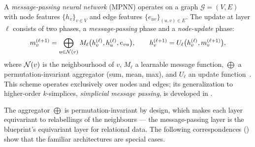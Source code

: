 \begin{definition}
\label{def:priors:mpnn}
A \emph{message-passing neural network} (MPNN) operates on a graph
$\mathcal{G} = (V, E)$ with node features $\{h_v\}_{v \in V}$ and edge features
$\{e_{uv}\}_{(u,v) \in E}$. The update at layer $\ell$ consists of two phases,
a \emph{message-passing} phase and a \emph{node-update} phase:
\[
  m_v^{(\ell+1)} = \bigoplus_{u \in \mathcal{N}(v)}
      M_\ell\bigl(h_v^{(\ell)}, h_u^{(\ell)}, e_{vu}\bigr),
  \qquad
  h_v^{(\ell+1)} = U_\ell\bigl(h_v^{(\ell)}, m_v^{(\ell+1)}\bigr),
\]
where $\mathcal{N}(v)$ is the neighbourhood of $v$, $M_\ell$ a learnable message
function, $\bigoplus$ a permutation-invariant aggregator (sum, mean, max), and
$U_\ell$ an update function~\citep{gilmer2017neural}. This scheme operates
exclusively over nodes and edges; its generalization to higher-order
$k$-simplices, \emph{simplicial message passing}, is developed in
.
\end{definition}

The aggregator $\bigoplus$ is permutation-invariant by design, which makes each
layer equivariant to relabellings of the neighbours --- the message-passing
layer is the blueprint's equivariant layer for relational data. The following
correspondences () show that the familiar architectures
are special cases.

